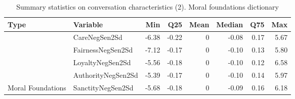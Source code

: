 \begin{table}[!h]
\centering
\caption{\label{tab:summ-tab-emf}Summary statistics on conversation characteristics (2). Moral foundations dictionary}
\centering
\begin{tabular}[t]{llrrrrrr}
\toprule
Type & Variable & Min & Q25 & Mean & Median & Q75 & Max\\
\midrule
 & CareNegSen2Sd & -6.38 & -0.22 & 0 & -0.08 & 0.17 & 5.67\\
\cmidrule{2-8}
 & FairnessNegSen2Sd & -7.12 & -0.17 & 0 & -0.10 & 0.13 & 5.80\\
\cmidrule{2-8}
 & LoyaltyNegSen2Sd & -5.56 & -0.18 & 0 & -0.10 & 0.12 & 6.58\\
\cmidrule{2-8}
 & AuthorityNegSen2Sd & -5.39 & -0.17 & 0 & -0.10 & 0.14 & 5.97\\
\cmidrule{2-8}
\multirow{-5}{*}{\raggedright\arraybackslash Moral Foundations} & SanctityNegSen2Sd & -5.68 & -0.18 & 0 & -0.09 & 0.16 & 6.18\\
\bottomrule
\end{tabular}
\end{table}
